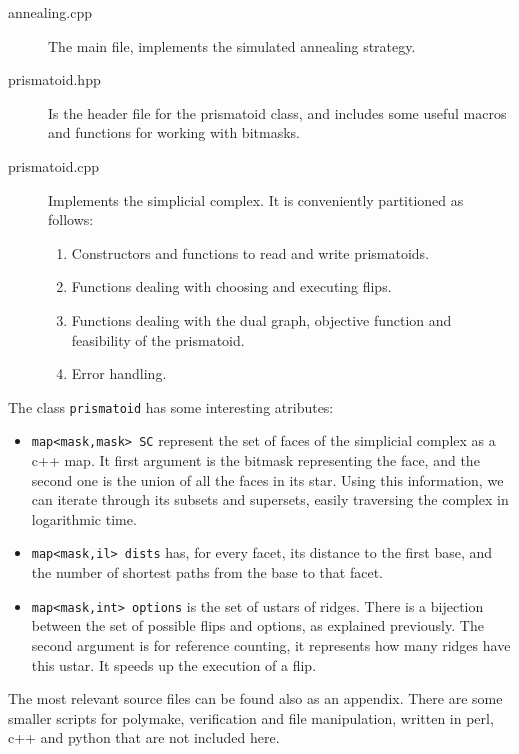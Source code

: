 \documentclass[12pt,a4paper]{article}
\theoremstyle{plain}
\theoremstyle{definition}
\begin{document}
\begin{description}
  \item[annealing.cpp] The main file, implements the simulated annealing strategy.
  \item[prismatoid.hpp] Is the header file for the prismatoid class, and includes some useful macros and functions for working with bitmasks.
  \item[prismatoid.cpp] Implements the simplicial complex. It is conveniently partitioned as follows:
    \begin{enumerate}
      \item Constructors and functions to read and write prismatoids.
      \item Functions dealing with choosing and executing flips.
      \item Functions dealing with the dual graph, objective function and feasibility of the prismatoid.
      \item Error handling.
    \end{enumerate}
\end{description}

The class \lstinline{prismatoid} has some interesting atributes:

\begin{itemize}
  \item \lstinline{map<mask,mask> SC} represent the set of faces of the simplicial complex as a c++ map. It first argument is the bitmask representing the face, and the second one is the union of all the faces in its star. Using this information, we can iterate through its subsets and supersets, easily traversing the complex in logarithmic time.
  \item \lstinline{map<mask,il> dists} has, for every facet, its distance to the first base, and the number of shortest paths from the base to that facet.

  \item \lstinline{map<mask,int> options} is the set of ustars of ridges. There is a bijection between the set of possible flips and options, as explained previously. The second argument is for reference counting, it represents how many ridges have this ustar. It speeds up the execution of a flip.
\end{itemize}

The most relevant source files can be found also as an appendix. There are some smaller scripts for polymake, verification and file manipulation, written in perl, c++ and python that are not included here.
\end{document}
